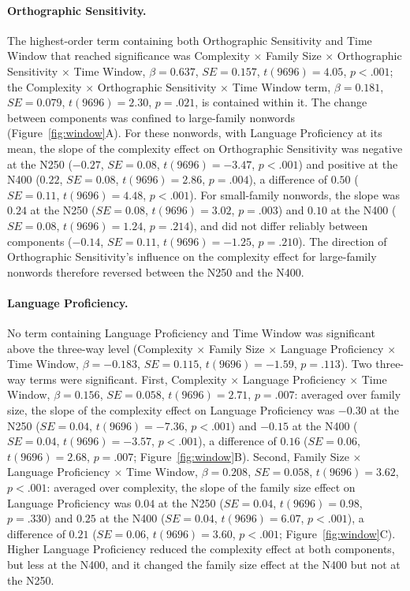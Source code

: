 \documentclass[utf8]{FrontiersinHarvard} %
\begin{document}
\paragraph*{Orthographic Sensitivity.} The highest-order term containing both Orthographic Sensitivity and Time Window that reached significance was Complexity $\times$ Family Size $\times$ Orthographic Sensitivity $\times$ Time Window, $\beta = 0.637$, $SE = 0.157$, $t(9696) = 4.05$, $p < .001$; the Complexity $\times$ Orthographic Sensitivity $\times$ Time Window term, $\beta = 0.181$, $SE = 0.079$, $t(9696) = 2.30$, $p = .021$, is contained within it. The change between components was confined to large-family nonwords (Figure~\ref{fig:window}A). For these nonwords, with Language Proficiency at its mean, the slope of the complexity effect on Orthographic Sensitivity was negative at the N250 ($-0.27$, $SE = 0.08$, $t(9696) = -3.47$, $p < .001$) and positive at the N400 ($0.22$, $SE = 0.08$, $t(9696) = 2.86$, $p = .004$), a difference of $0.50$ ($SE = 0.11$, $t(9696) = 4.48$, $p < .001$). For small-family nonwords, the slope was $0.24$ at the N250 ($SE = 0.08$, $t(9696) = 3.02$, $p = .003$) and $0.10$ at the N400 ($SE = 0.08$, $t(9696) = 1.24$, $p = .214$), and did not differ reliably between components ($-0.14$, $SE = 0.11$, $t(9696) = -1.25$, $p = .210$). The direction of Orthographic Sensitivity's influence on the complexity effect for large-family nonwords therefore reversed between the N250 and the N400.

\paragraph*{Language Proficiency.} No term containing Language Proficiency and Time Window was significant above the three-way level (Complexity $\times$ Family Size $\times$ Language Proficiency $\times$ Time Window, $\beta = -0.183$, $SE = 0.115$, $t(9696) = -1.59$, $p = .113$). Two three-way terms were significant. First, Complexity $\times$ Language Proficiency $\times$ Time Window, $\beta = 0.156$, $SE = 0.058$, $t(9696) = 2.71$, $p = .007$: averaged over family size, the slope of the complexity effect on Language Proficiency was $-0.30$ at the N250 ($SE = 0.04$, $t(9696) = -7.36$, $p < .001$) and $-0.15$ at the N400 ($SE = 0.04$, $t(9696) = -3.57$, $p < .001$), a difference of $0.16$ ($SE = 0.06$, $t(9696) = 2.68$, $p = .007$; Figure~\ref{fig:window}B). Second, Family Size $\times$ Language Proficiency $\times$ Time Window, $\beta = 0.208$, $SE = 0.058$, $t(9696) = 3.62$, $p < .001$: averaged over complexity, the slope of the family size effect on Language Proficiency was $0.04$ at the N250 ($SE = 0.04$, $t(9696) = 0.98$, $p = .330$) and $0.25$ at the N400 ($SE = 0.04$, $t(9696) = 6.07$, $p < .001$), a difference of $0.21$ ($SE = 0.06$, $t(9696) = 3.60$, $p < .001$; Figure~\ref{fig:window}C). Higher Language Proficiency reduced the complexity effect at both components, but less at the N400, and it changed the family size effect at the N400 but not at the N250.
\end{document}
